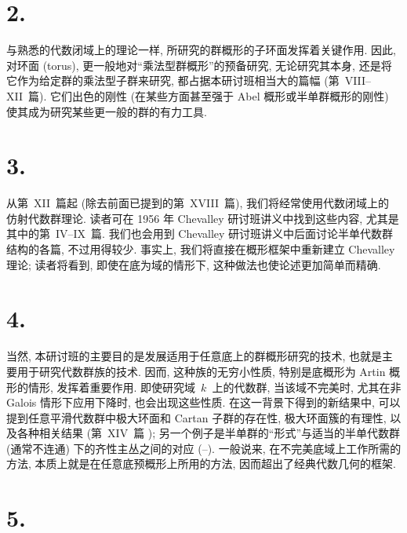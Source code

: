 \section*{2.}

与熟悉的代数闭域上的理论一样, 所研究的群概形的子环面发挥着关键作用.
因此, 对环面 (torus), 更一般地对“乘法型群概形”的预备研究,
无论研究其本身, 还是将它作为给定群的乘法型子群来研究, 都占据本研讨班相当大的篇幅
(第~VIII--XII~篇). 它们出色的刚性 (在某些方面甚至强于 Abel 概形或半单群概形的刚性)
使其成为研究某些更一般的群的有力工具.

\section*{3.}

从第~XII~篇起 (除去前面已提到的第~XVIII~篇), 我们将经常使用代数闭域上的
仿射代数群理论. 读者可在 1956 年 Chevalley 研讨班讲义中找到这些内容,
尤其是其中的第~IV--IX~篇. 我们也会用到 Chevalley 研讨班讲义中后面讨论半单代数群
结构的各篇, 不过用得较少. 事实上, 我们将直接在概形框架中重新建立 Chevalley 理论;
读者将看到, 即使在底为域的情形下, 这种做法也使论述更加简单而精确.

\section*{4.}

当然, 本研讨班的主要目的是发展适用于任意底上的群概形研究的技术,
也就是主要用于研究代数群族的技术. 因而, 这种族的无穷小性质, 特别是底概形为
Artin 概形的情形, 发挥着重要作用. 即使研究域~$k$~上的代数群,
当该域不完美时, 尤其在非 Galois 情形下应用下降时, 也会出现这些性质.
在这一背景下得到的新结果中, 可以提到任意平滑代数群中极大环面和 Cartan 子群的存在性,
极大环面簇的有理性, 以及各种相关结果 (第~XIV~篇
);
另一个例子是半单群的“形式”与适当的半单代数群 (通常不连通) 下的齐性主丛之间的对应
(--).
一般说来, 在不完美底域上工作所需的方法, 本质上就是在任意底预概形上所用的方法,
因而超出了经典代数几何的框架.

\section*{5.}

